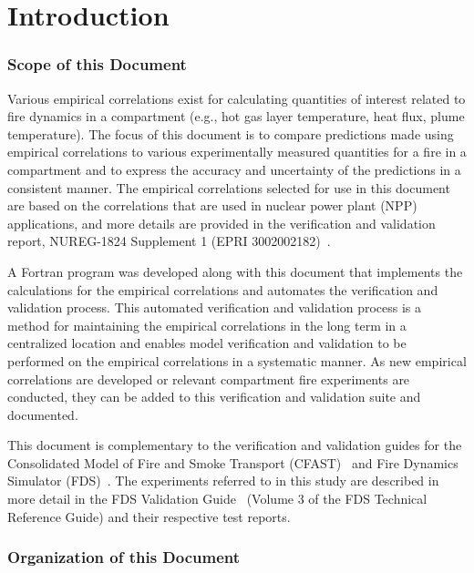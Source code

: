 
\chapter{Introduction}
\label{Introduction_Chapter}

\subsection*{Scope of this Document}

Various empirical correlations exist for calculating quantities of interest related to fire dynamics in a compartment (e.g., hot gas layer temperature, heat flux, plume temperature). The focus of this document is to compare predictions made using empirical correlations to various experimentally measured quantities for a fire in a compartment and to express the accuracy and uncertainty of the predictions in a consistent manner. The empirical correlations selected for use in this document are based on the correlations that are used in nuclear power plant (NPP) applications, and more details are provided in the verification and validation report, NUREG-1824 Supplement 1 (EPRI 3002002182)~\cite{NUREG_1824_Sup_1}.

A Fortran program was developed along with this document that implements the calculations for the empirical correlations and automates the verification and validation process. This automated verification and validation process is a method for maintaining the empirical correlations in the long term in a centralized location and enables model verification and validation to be performed on the empirical correlations in a systematic manner. As new empirical correlations are developed or relevant compartment fire experiments are conducted, they can be added to this verification and validation suite and documented.

This document is complementary to the verification and validation guides for the Consolidated Model of Fire and Smoke Transport (CFAST)~\cite{CFAST_Tech_Guide_6} and Fire Dynamics Simulator (FDS)~\cite{FDS_Verification_Guide, FDS_Validation_Guide}. The experiments referred to in this study are described in more detail in the FDS Validation Guide~\cite{FDS_Validation_Guide} (Volume 3 of the FDS Technical Reference Guide) and their respective test reports.


\subsection*{Organization of this Document}

